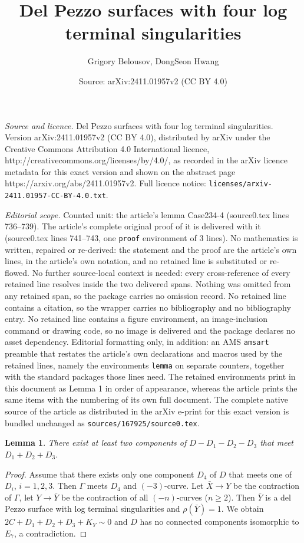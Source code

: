 \documentclass[10pt,a4paper]{amsart}
\title{Del Pezzo surfaces with four log terminal singularities}
\author{Grigory Belousov, DongSeon Hwang}
\date{Source: arXiv:2411.01957v2 (CC BY 4.0)}
\newtheorem{lemma}{Lemma}
\begin{document}
\maketitle

\noindent\emph{Source and licence.} Del Pezzo surfaces with four log terminal singularities. Version arXiv:2411.01957v2 (CC BY 4.0), distributed by arXiv under the Creative Commons Attribution 4.0 International licence, http://creativecommons.org/licenses/by/4.0/, as recorded in the arXiv licence metadata for this exact version and shown on the abstract page https://arxiv.org/abs/2411.01957v2. Full licence notice: \texttt{licenses/arxiv-2411.01957-CC-BY-4.0.txt}.\par\smallskip

\noindent\textit{Editorial scope.} Counted unit: the article's lemma Case234-4 (source0.tex lines 736--739). The article's complete original proof of it is delivered with it (source0.tex lines 741--743, one \texttt{proof} environment of 3 lines). No mathematics is written, repaired or re-derived: the statement and the proof are the article's own lines, in the article's own notation, and no retained line is substituted or re-flowed.  No further source-local context is needed: every cross-reference of every retained line resolves inside the two delivered spans.  Nothing was omitted from any retained span, so the package carries no omission record.  No retained line contains a citation, so the wrapper carries no bibliography and no bibliography entry.  No retained line contains a figure environment, an image-inclusion command or drawing code, so no image is delivered and the package declares no asset dependency.  Editorial formatting only, in addition: an AMS \texttt{amsart} preamble that restates the article's own declarations and macros used by the retained lines, namely the environments \texttt{lemma} on separate counters, together with the standard packages those lines need.  The retained environments print in this document as Lemma 1 in order of appearance, whereas the article prints the same items with the numbering of its own full document.  The complete native source of the article as distributed in the arXiv e-print for this exact version is bundled unchanged as \texttt{sources/167925/source0.tex}.
\begin{lemma}
\label{Case234-4}
There exist at least two components of $D-D_1-D_2-D_3$ that meet $D_1+D_2+D_3$.
\end{lemma}

\begin{proof}
Assume that there exists only one component $D_4$ of $D$ that meets one of $D_i$, $i=1,2,3$. Then $\Gamma$ meets $D_4$ and $(-3)$-curve. Let $\bar{X}\rightarrow Y$ be the contraction of $\Gamma$, let $Y\rightarrow\bar{Y}$ be the contraction of all $(-n)$-curves ($n\geq 2$). Then $\bar{Y}$ is a del Pezzo surface with log terminal singularities and $\rho(\bar{Y})=1$. We obtain $2C+D_1+D_2+D_3+K_{Y}\sim 0$ and $D$ has no connected components isomorphic to $E_7$, a contradiction.
\end{proof}
\end{document}
